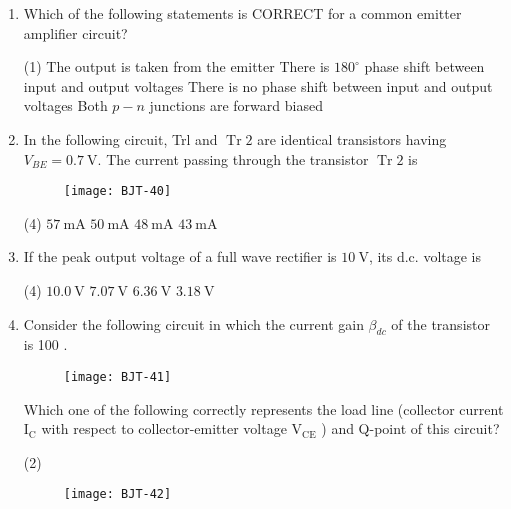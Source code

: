 \begin{enumerate}
	\item Which of the following statements is CORRECT for a common emitter amplifier circuit?
	{	}
	\begin{tasks}(1)
		\task[\textbf{A.}] The output is taken from the emitter
		\task[\textbf{B.}] There is $180^{\circ}$ phase shift between input and output voltages
		\task[\textbf{C.}] There is no phase shift between input and output voltages
		\task[\textbf{D.}] Both $p-n$ junctions are forward biased
	\end{tasks}
	\item 	In the following circuit, Trl and $\operatorname{Tr} 2$ are identical transistors having $V_{B E}=0.7 \mathrm{~V}$. The current passing through the transistor $\operatorname{Tr} 2$ is
	{}
	\begin{figure}[H]
		\centering
		\texttt{[image: BJT-40]}
	\end{figure}
	\begin{tasks}(4)
		\task[\textbf{A.}] $57 \mathrm{~mA}$
		\task[\textbf{B.}] $50 \mathrm{~mA}$
		\task[\textbf{C.}] $48 \mathrm{~mA}$
		\task[\textbf{D.}] $43 \mathrm{~mA}$
	\end{tasks}
	\item If the peak output voltage of a full wave rectifier is $10 \mathrm{~V}$, its d.c. voltage is
	{	}
	\begin{tasks}(4)
		\task[\textbf{A.}] $10.0 \mathrm{~V}$
		\task[\textbf{B.}] $7.07 \mathrm{~V}$
		\task[\textbf{C.}] $6.36 \mathrm{~V}$
		\task[\textbf{D.}] $3.18 \mathrm{~V}$
	\end{tasks}
	\item Consider the following circuit in which the current gain $\beta_{d c}$ of the transistor is 100 .\\
	\begin{figure}[H]
		\centering
		\texttt{[image: BJT-41]}
	\end{figure}
	Which one of the following correctly represents the load line (collector current $\mathrm{I}_{\mathrm{C}}$ with respect to collector-emitter voltage $\mathrm{V}_{\mathrm{CE}}$ ) and Q-point of this circuit?
	{	}
	\begin{tasks}(2)
		\task[\textbf{A.}]\begin{figure}[H]
			\centering
			\texttt{[image: BJT-42]}
		\end{figure}
		\task[\textbf{B.}] \begin{figure}[H]

\end{figure}
\end{tasks}
\end{enumerate}
